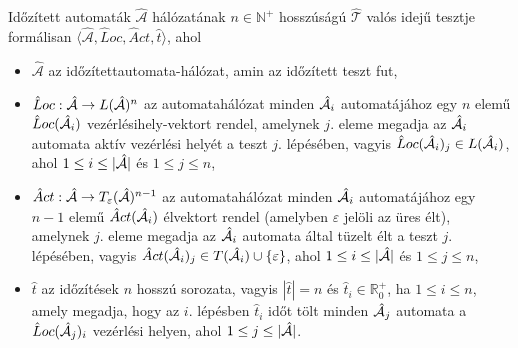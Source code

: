 \begin{definition}
\label{ValósIdejűTesztKiterjesztés}
Időzített automaták $\hat{\mathcal{A}}$ hálózatának $n \in \mathbb{N}^+$ hosszúságú $\hat{\mathcal{T}}$ valós idejű tesztje formálisan $\langle \hat{\mathcal{A}}, \hat{L}oc, \hat{A}ct, \hat{t} \rangle$, ahol

\begin{itemize}
    \item $\hat{\mathcal{A}}$ az időzítettautomata-hálózat, amin az időzített teszt fut,
    \item $\hat{L}oc: \hat{\mathcal{A}} \rightarrow L(\hat{\mathcal{A}})^n$  az automatahálózat minden $\hat{\mathcal{A}}_i$ automatájához egy $n$ elemű $\hat{L}oc(\hat{\mathcal{A}}_i)$ vezérlésihely-vektort rendel, amelynek $j.$ eleme megadja az $\hat{\mathcal{A}}_i$ automata aktív vezérlési helyét a teszt $j.$ lépésében, vagyis $\hat{L}oc(\hat{\mathcal{A}}_i)_j \in L(\hat{\mathcal{A}}_i)$, ahol $1 \leq i \leq |\hat{\mathcal{A}}|$ és $1 \leq j \leq n$,
    
    
    \item $\hat{A}ct: \hat{\mathcal{A}} \rightarrow T_\varepsilon(\hat{\mathcal{A}})^{n-1}$  az automatahálózat minden $\hat{\mathcal{A}}_i$ automatájához egy $n-1$ elemű $\hat{A}ct(\hat{\mathcal{A}}_i)$ élvektort rendel (amelyben $\varepsilon$ jelöli az üres élt), amelynek $j.$ eleme megadja az $\hat{\mathcal{A}}_i$ automata által tüzelt élt a teszt $j.$ lépésében, vagyis $\hat{A}ct(\hat{\mathcal{A}}_i)_j \in T(\hat{\mathcal{A}}_i) \cup \{ \varepsilon \}$, ahol $1 \leq i \leq |\hat{\mathcal{A}}|$ és $1 \leq j \leq n$,
    
    \item $\hat{t}$ az időzítések $n$ hosszú sorozata, vagyis $|\hat{t}| = n$ és $\hat{t}_i \in \mathbb{R}_0^+$, ha $1 \leq i \leq n$, amely megadja, hogy az $i.$ lépésben $\hat{t}_i$ időt tölt minden $\hat{\mathcal{A}}_j$ automata a $\hat{L}oc(\hat{\mathcal{A}}_j)_i$ vezérlési helyen, ahol $1 \leq j \leq |\hat{\mathcal{A}}|$.
\end{itemize}
\end{definition}


